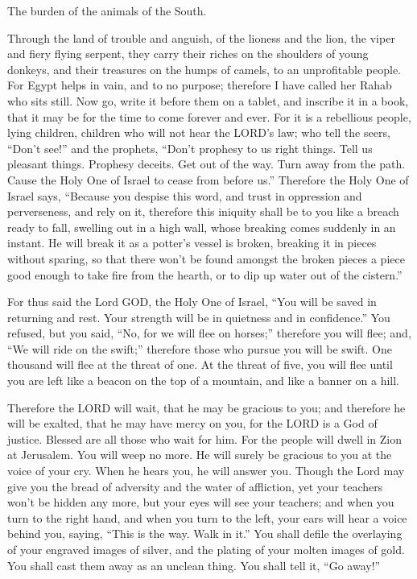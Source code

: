  The burden of the animals of the South.

Through the land of trouble and anguish, of the lioness and the lion,
the viper and fiery flying serpent, they carry their riches on the
shoulders of young donkeys, and their treasures on the humps of camels,
to an unprofitable people.  For Egypt helps in vain, and
to no purpose; therefore I have called her Rahab who sits still.
 Now go, write it before them on a tablet, and inscribe it
in a book, that it may be for the time to come forever and ever.
 For it is a rebellious people, lying children, children
who will not hear the LORD's law;  who tell the seers,
``Don't see!'' and the prophets, ``Don't prophesy to us right things.
Tell us pleasant things. Prophesy deceits.  Get out of
the way. Turn away from the path. Cause the Holy One of Israel to cease
from before us.''  Therefore the Holy One of Israel says,
``Because you despise this word, and trust in oppression and
perverseness, and rely on it,  therefore this iniquity
shall be to you like a breach ready to fall, swelling out in a high
wall, whose breaking comes suddenly in an instant.  He
will break it as a potter's vessel is broken, breaking it in pieces
without sparing, so that there won't be found amongst the broken pieces
a piece good enough to take fire from the hearth, or to dip up water out
of the cistern.''

 For thus said the Lord GOD, the Holy One of Israel,
``You will be saved in returning and rest. Your strength will be in
quietness and in confidence.'' You refused,  but you
said, ``No, for we will flee on horses;'' therefore you will flee; and,
``We will ride on the swift;'' therefore those who pursue you will be
swift.  One thousand will flee at the threat of one. At
the threat of five, you will flee until you are left like a beacon on
the top of a mountain, and like a banner on a hill.

 Therefore the LORD will wait, that he may be gracious to
you; and therefore he will be exalted, that he may have mercy on you,
for the LORD is a God of justice. Blessed are all those who wait for
him.  For the people will dwell in Zion at Jerusalem. You
will weep no more. He will surely be gracious to you at the voice of
your cry. When he hears you, he will answer you.  Though
the Lord may give you the bread of adversity and the water of
affliction, yet your teachers won't be hidden any more, but your eyes
will see your teachers;  and when you turn to the right
hand, and when you turn to the left, your ears will hear a voice behind
you, saying, ``This is the way. Walk in it.''  You shall
defile the overlaying of your engraved images of silver, and the plating
of your molten images of gold. You shall cast them away as an unclean
thing. You shall tell it, ``Go away!''

